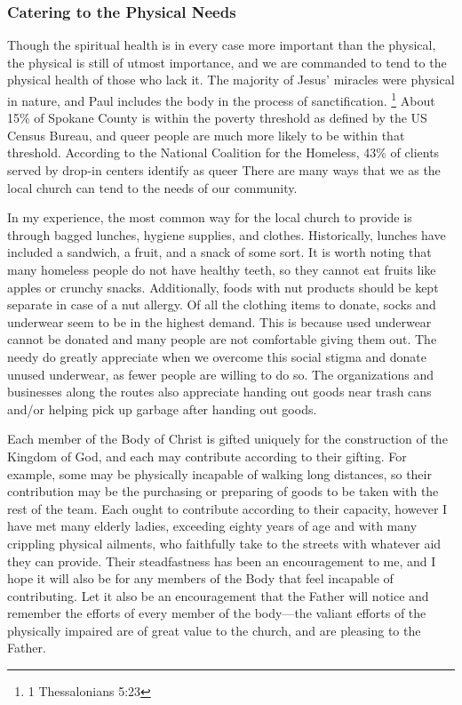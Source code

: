 \subsubsection{Catering to the Physical Needs}

    \qJamesPhysical
    Though the spiritual health is in every case more important than the physical, the physical is still of utmost importance, and we are commanded to tend to the physical health of those who lack it.
    The majority of Jesus' miracles were physical in nature, and Paul includes the body in the process of sanctification.
    \footnote{1 Thessalonians 5:23}
    About 15\% of Spokane County is within the poverty threshold as defined by the US Census Bureau\cite{census}, and queer people are much more likely to be within that threshold.
    According to the National Coalition for the Homeless, 43\% of clients served by drop-in centers identify as queer\cite{nch}
    There are many ways that we as the local church can tend to the needs of our community.

    \par In my experience, the most common way for the local church to provide is through bagged lunches, hygiene supplies, and clothes.
    Historically, lunches have included a sandwich, a fruit, and a snack of some sort.
    It is worth noting that many homeless people do not have healthy teeth, so they cannot eat fruits like apples or crunchy snacks.
    Additionally, foods with nut products should be kept separate in case of a nut allergy.
    Of all the clothing items to donate, socks and underwear seem to be in the highest demand.
    This is because used underwear cannot be donated and many people are not comfortable giving them out.
    The needy do greatly appreciate when we overcome this social stigma and donate unused underwear, as fewer people are willing to do so.
    The organizations and businesses along the routes also appreciate handing out goods near trash cans and/or helping pick up garbage after handing out goods.

    \qHebSix
    Each member of the Body of Christ is gifted uniquely for the construction of the Kingdom of God, and each may contribute according to their gifting.
    For example, some may be physically incapable of walking long distances, so their contribution may be the purchasing or preparing of goods to be taken with the rest of the team.
    Each ought to contribute according to their capacity, however I have met many elderly ladies, exceeding eighty years of age and with many crippling physical ailments, who faithfully take to the streets with whatever aid they can provide.
    Their steadfastness has been an encouragement to me, and I hope it will also be for any members of the Body that feel incapable of contributing.
    Let it also be an encouragement that the Father will notice and remember the efforts of every member of the body---the valiant efforts of the physically impaired are of great value to the church, and are pleasing to the Father.

